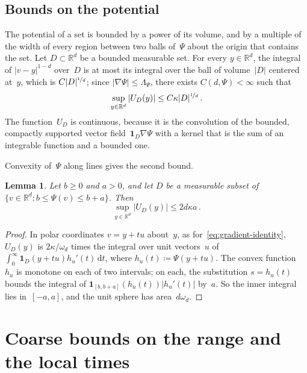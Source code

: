\documentclass[11pt]{amsart}
\theoremstyle{plain}
\newtheorem{lemma}[theorem]{Lemma}
\theoremstyle{definition}
\newcommand{\R}{\mathbb R}
\newcommand{\drift}{\kappa}
\newcommand{\gauge}{\Psi}
\newcommand{\ind}{\mathbf 1}
\newcommand{\dd}{\,\mathrm d}
\newcommand{\nf}{\nicefrac}
\numberwithin{equation}{section}
\begin{document}
\subsection{Bounds on the potential}\label{sec:potential-bounds}

The potential of a set is bounded by a power of its volume, and by a multiple of the width of every region between two balls of~$\gauge$ about the origin that contains the set. Let $D\subset\R^d$ be a bounded measurable set. For every $y\in\R^d$, the integral of $|v-y|^{1-d}$ over~$D$ is at most its integral over the ball of volume~$|D|$ centered at~$y$, which is $C|D|^{\nf{1}{d}}$; since $|\nabla \gauge|\leq\Lambda_\gauge$, there exists $C(d,\gauge)<\infty$ such that
\begin{equation}\label{eq:potential-bound}
\sup_{y\in\R^d}|U_D(y)|\leq C\drift|D|^{\nf{1}{d}}\, .
\end{equation}
The function~$U_D$ is continuous, because it is the convolution of the bounded, compactly supported vector field~$\ind_D\nabla\gauge$ with a kernel that is the sum of an integrable function and a bounded one.

Convexity of~$\gauge$ along lines gives the second bound.

\begin{lemma}\label{lem:layer}
Let $b\geq0$ and $a>0$, and let $D$ be a measurable subset of $\{v\in\R^d:b\leq \gauge(v)\leq b+a\}$. Then
\begin{equation*}
\sup_{y\in\R^d}|U_D(y)|\leq2d\drift a\, .
\end{equation*}
\end{lemma}

\begin{proof}
In polar coordinates $v=y+tu$ about~$y$, as for~\eqref{eq:gradient-identity}, $U_D(y)$ is $2\drift/\omega_d$ times the integral over unit vectors~$u$ of $\int_0^\infty\ind_D(y+tu)h_u'(t)\dd t$, where $h_u(t)\coloneqq\gauge(y+tu)$. The convex function~$h_u$ is monotone on each of two intervals; on each, the substitution $s=h_u(t)$ bounds the integral of $\ind_{[b,b+a]}(h_u(t))|h_u'(t)|$ by~$a$. So the inner integral lies in~$[-a,a]$, and the unit sphere has area~$d\omega_d$.
\end{proof}

\section{Coarse bounds on the range and the local times}\label{sec:coarse}
\end{document}
